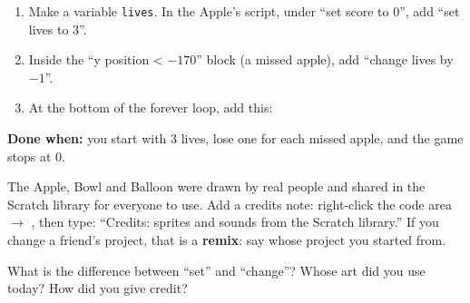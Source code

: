 \begin{exercise}
\begin{enumerate}[leftmargin=1.4em,itemsep=1pt]
  \item Make a variable \texttt{lives}. In the Apple's script, under \enquote{set score to 0}, add \enquote{set lives to 3}.
  \item Inside the \enquote{y position < $-170$} block (a missed apple), add \enquote{change lives by $-1$}.
  \item At the bottom of the forever loop, add this:
\end{enumerate}
\begin{center}
\begin{scratch}[scale=0.8]
\end{scratch}
\end{center}
\textbf{Done when:} you start with 3 lives, lose one for each missed apple, and the game stops at 0.
\end{exercise}

\begin{safety}
The Apple, Bowl and Balloon were drawn by real people and shared in the Scratch library for everyone to use. Add a credits note: right-click the code area $\rightarrow$ , then type: \enquote{Credits: sprites and sounds from the Scratch library.} If you change a friend's project, that is a \textbf{remix}: say whose project you started from.
\end{safety}

\begin{vocab}
\end{vocab}

\begin{reflection}
What is the difference between \enquote{set} and \enquote{change}?
Whose art did you use today? How did you give credit?
\end{reflection}
